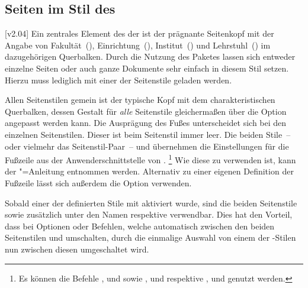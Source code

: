 \subsection{Seiten im Stil des \CDs}
\begin{Declaration}[v2.02]{}
\begin{Declaration}[v2.02]{}
\begin{Declaration}[v2.02]{}
\printdeclarationlist%
\label{sec:tudheadings}
%
[v2.04]
%
Ein zentrales Element des \CDs der \TnUD ist der prägnante Seitenkopf mit der 
Angabe von Fakultät~(), Einrichtung~(), 
Institut~() und Lehrstuhl~() im dazugehörigen 
Querbalken. Durch die Nutzung des Paketes  lassen 
sich entweder einzelne Seiten oder auch ganze Dokumente sehr einfach in diesem 
Stil setzen. Hierzu muss lediglich mit  
einer der Seitenstile geladen werden. 

Allen Seitenstilen gemein ist der typische Kopf mit dem charakteristischen 
Querbalken, dessen Gestalt für \emph{alle} Seitenstile gleichermaßen über die 
Option  angepasst werden kann. Die Ausprägung des Fußes 
unterscheidet sich bei den einzelnen Seitenstilen. Dieser ist beim Seitenstil 
 immer leer. Die beiden Stile~-- oder vielmehr das 
Seitenstil-Paar~--  und  
übernehmen die Einstellungen für die Fußzeile aus der Anwenderschnittstelle von 
.%
\footnote{%
  Es können die Befehle ,  und  sowie 
  ,  und  respektive , 
   und  genutzt werden.
}
Wie diese zu verwenden ist, kann der \KOMAScript"=Anleitung entnommen werden. 
Alternativ zu einer eigenen Definition der Fußzeile lässt sich außerdem die 
Option  verwenden.

Sobald einer der definierten Stile mit  
aktiviert wurde, sind die beiden Seitenstile  sowie 
 zusätzlich unter den Namen  
respektive  verwendbar. Dies hat den Vorteil, dass bei 
Optionen oder Befehlen, welche automatisch zwischen den beiden Seitenstilen 
 und  umschalten, durch die einmalige 
Auswahl von einem der -Stilen nun zwischen diesen  
umgeschaltet wird.


\end{Declaration}
\end{Declaration}
\end{Declaration}
